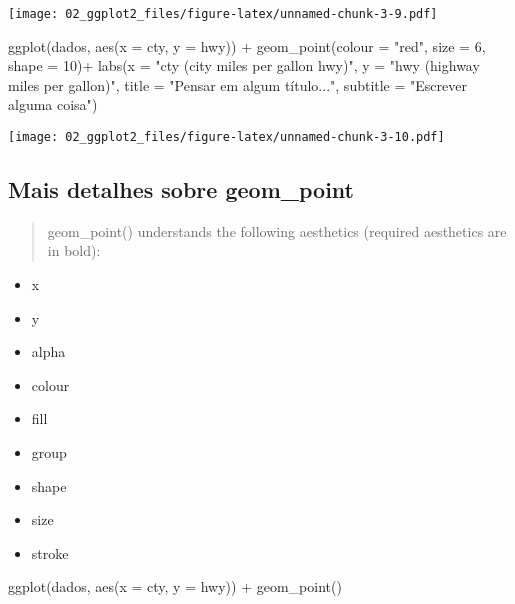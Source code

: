 \documentclass[
]{book}
\newenvironment{Shaded}{\begin{snugshade}}{\end{snugshade}}
\newcommand{\AttributeTok}[1]{\textcolor[rgb]{0.77,0.63,0.00}{#1}}
\newcommand{\DecValTok}[1]{\textcolor[rgb]{0.00,0.00,0.81}{#1}}
\newcommand{\FunctionTok}[1]{\textcolor[rgb]{0.00,0.00,0.00}{#1}}
\newcommand{\NormalTok}[1]{#1}
\newcommand{\SpecialCharTok}[1]{\textcolor[rgb]{0.00,0.00,0.00}{#1}}
\newcommand{\StringTok}[1]{\textcolor[rgb]{0.31,0.60,0.02}{#1}}
\begin{document}
\texttt{[image: 02\_ggplot2\_files/figure-latex/unnamed-chunk-3-9.pdf]}

\begin{Shaded}
\begin{Highlighting}[]
\FunctionTok{ggplot}\NormalTok{(dados, }\FunctionTok{aes}\NormalTok{(}\AttributeTok{x =}\NormalTok{ cty, }\AttributeTok{y =}\NormalTok{ hwy)) }\SpecialCharTok{+} 
  \FunctionTok{geom\_point}\NormalTok{(}\AttributeTok{colour =} \StringTok{"red"}\NormalTok{, }\AttributeTok{size =} \DecValTok{6}\NormalTok{, }\AttributeTok{shape =} \DecValTok{10}\NormalTok{)}\SpecialCharTok{+}
  \FunctionTok{labs}\NormalTok{(}\AttributeTok{x =} \StringTok{"cty (city miles per gallon hwy)"}\NormalTok{, }
       \AttributeTok{y =} \StringTok{"hwy (highway miles per gallon)"}\NormalTok{, }
       \AttributeTok{title =} \StringTok{"Pensar em algum título..."}\NormalTok{, }
       \AttributeTok{subtitle =} \StringTok{"Escrever alguma coisa"}\NormalTok{)}
\end{Highlighting}
\end{Shaded}

\texttt{[image: 02\_ggplot2\_files/figure-latex/unnamed-chunk-3-10.pdf]}

\hypertarget{mais-detalhes-sobre-geom_point}{%
\subsection{Mais detalhes sobre geom\_point}\label{mais-detalhes-sobre-geom_point}}

\begin{quote}
geom\_point() understands the following aesthetics (required aesthetics are in bold):
\end{quote}

\begin{itemize}
\item
  x
\item
  y
\item
  alpha
\item
  colour
\item
  fill
\item
  group
\item
  shape
\item
  size
\item
  stroke
\end{itemize}

\begin{Shaded}
\begin{Highlighting}[]
\FunctionTok{ggplot}\NormalTok{(dados, }\FunctionTok{aes}\NormalTok{(}\AttributeTok{x =}\NormalTok{ cty, }\AttributeTok{y =}\NormalTok{ hwy)) }\SpecialCharTok{+} 
  \FunctionTok{geom\_point}\NormalTok{()}
\end{Highlighting}
\end{Shaded}
\end{document}
